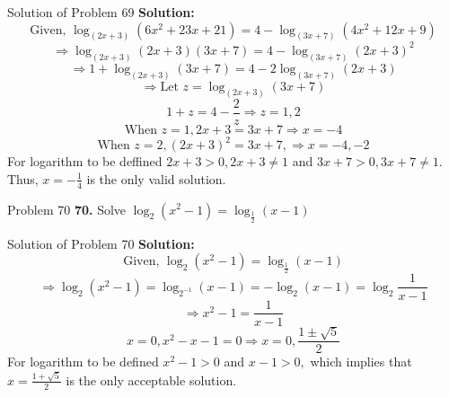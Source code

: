 \documentclass[aspectratio=1610,8pt]{beamer}
\begin{document}
\begin{frame}{Solution of Problem 69}
  \textbf{Solution:} $$\text{Given,~}\log_{(2x + 3)}(6x^2 + 23x + 21) = 4 - \log_{(3x + 7)}(4x^2 + 12x + 9)$$
  $$\Rightarrow \log_{(2x+3)}(2x + 3)(3x + 7) = 4 - \log_{(3x + 7)}(2x + 3)^2$$
  $$\Rightarrow 1 + \log_{(2x + 3)}(3x + 7) = 4 - 2\log_{(3x+7)}(2x + 3)$$
  $$\Rightarrow \text{Let~}z = \log_{(2x + 3)}(3x + 7)$$
  $$1 + z = 4 - \frac{2}{z}\Rightarrow z = 1, 2$$
  $$\text{When~}z = 1, 2x + 3 = 3x + 7 \Rightarrow x = -4$$
  $$\text{When~}z = 2, (2x + 3)^2 = 3x + 7, \Rightarrow x = -4, -2$$
  For logarithm to be deffined $2x + 3 > 0, 2x + 3 \neq 1$ and $3x + 7 > 0, 3x + 7 \neq 1.$ Thus, $x = -\frac{1}{4}$ is the only
  valid solution.
\end{frame}
\begin{frame}{Problem 70}
  \textbf{70.} Solve $\log_2(x^2 - 1) = \log_{\frac{1}{2}}(x - 1)$
\end{frame}
\begin{frame}{Solution of Problem 70}
  \textbf{Solution:} $$\text{Given,~}\log_2(x^2 - 1) = \log_{\frac{1}{2}}(x - 1)$$
  $$\Rightarrow \log_2(x^2 - 1) = \log_{2^{-1}}(x - 1) = -\log_2(x - 1) = \log_2\frac{1}{x - 1}$$
  $$\Rightarrow x^2 - 1 = \frac{1}{x - 1}$$
  $$x = 0, x^2 - x - 1 = 0\Rightarrow x = 0, \frac{1\pm\sqrt{5}}{2}$$
  For logarithm to be defined $x^2 - 1>0$ and $x - 1>0,$ which implies that $x = \frac{1 + \sqrt{5}}{2}$ is the only acceptable solution.
\end{frame}
\end{document}
